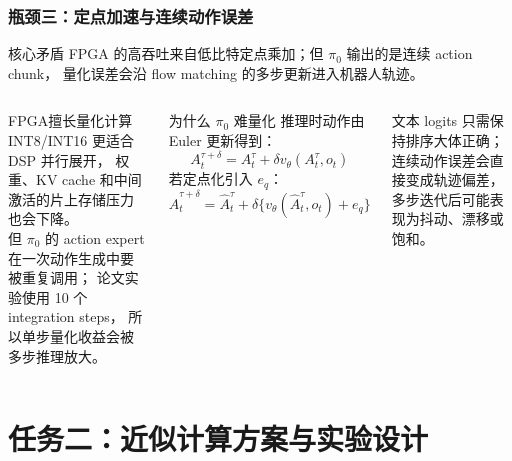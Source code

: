 \documentclass[10pt, aspectratio=169]{beamer}
\begin{document}
\begin{frame}
  \frametitle{瓶颈三：定点加速与连续动作误差}
  \small
  \begin{block}{核心矛盾}
    FPGA 的高吞吐来自低比特定点乘加；但 $\pi_0$ 输出的是连续 action chunk，
    量化误差会沿 flow matching 的多步更新进入机器人轨迹。
  \end{block}

  \vspace{2pt}
  \begin{columns}[T,onlytextwidth]
    \begin{exampleblock}{FPGA擅长量化计算}
      INT8/INT16 更适合 DSP 并行展开，
      权重、KV cache 和中间激活的片上存储压力也会下降。\\
      \vspace{3pt}
      但 $\pi_0$ 的 action expert 在一次动作生成中要被重复调用；
      论文实验使用 10 个 integration steps，
      所以单步量化收益会被多步推理放大。
    \end{exampleblock}

    \begin{alertblock}{为什么 $\pi_0$ 难量化}
      推理时动作由 Euler 更新得到：
      \[
        A_t^{\tau+\delta}=A_t^\tau+\delta v_\theta(A_t^\tau,o_t)
      \]
      若定点化引入 $e_q$：
      \[
        \hat A_t^{\tau+\delta}
        =\hat A_t^\tau+\delta\{v_\theta(\hat A_t^\tau,o_t)+e_q\}
      \]
    \end{alertblock}

    \vspace{2pt}
    文本 logits 只需保持排序大体正确；
    连续动作误差会直接变成轨迹偏差，
    多步迭代后可能表现为抖动、漂移或饱和。
  \end{columns}
\end{frame}

\section{任务二：近似计算方案与实验设计}
\end{document}
